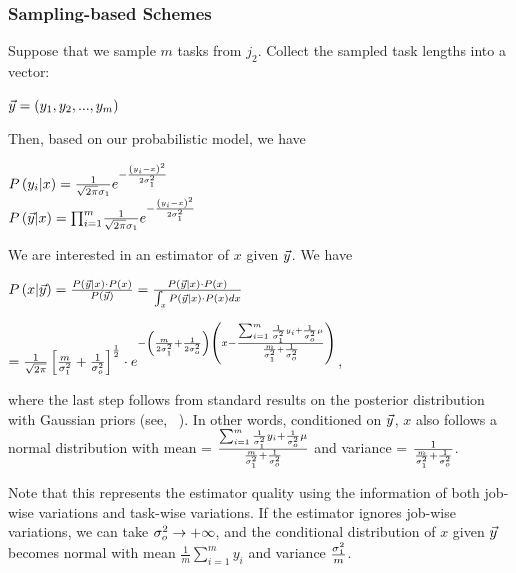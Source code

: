 \subsubsection{Sampling-based Schemes}
\label{sec:accuracy:quantity:sampling}
Suppose that we sample $m$ tasks from $j_2$. Collect the sampled task lengths into a vector:
\begin{center}
	$\vec{y} = \left( y_1, y_2, ..., y_m \right)$
\end{center}
Then, based on our probabilistic model, we have
\begin{center}
	$P\left(y_i|x\right) = \frac{1}{\sqrt{2\pi}\sigma_1}e^{-\frac{\left(y_i - x\right)^2}{2\sigma_1^2}}$\\
	$P\left(\vec{y}|x\right) = {\prod_{i=1}^{m}}\frac{1}{\sqrt{2\pi}\sigma_1}e^{-\frac{\left(y_i - x\right)^2}{2\sigma_1^2}}$
\end{center}
We are interested in an estimator of $x$ given $\vec{y}$. We have 
\begin{center}
	$P\left(x|\vec{y}\right) = \frac{P\left(\vec{y}|x\right)\cdot P(x)}{P(\vec{y})} = \frac{P(\vec{y}|x)\cdot P(x)}{\int_{x}P(\vec{y}|x)\cdot P(x)dx}$

	$= \frac{1}{\sqrt{2\pi}}\left[\frac{m}{\sigma_1^2} +
	\frac{1}{\sigma_o^2}\right]^\frac{1}{2} \cdot e^{-
	\left(\frac{m}{2\sigma_1^2} +
	\frac{1}{2\sigma_o^2}\right)\left(x -
	\frac{{\sum_{i=1}^{m}\frac{1}{\sigma_1^2}y_{i} +
	\frac{1}{\sigma_o^2}\mu}}{\frac{m}{\sigma_1^2} +
	\frac{1}{\sigma_o^2}}\right)}$,
\end{center}
where the last step follows from standard results on the posterior distribution
with Gaussian priors (see, \eg~\cite{jordanLecturePosterirorDistribution}).
In other words, conditioned on $\vec{y}$, $x$ also follows a normal distribution with
mean = $ \frac{{\sum_{i=1}^{m}\frac{1}{\sigma_1^2}y_{i} + \frac{1}{\sigma_o^2}\mu}}{\frac{m}{\sigma_1^2} + \frac{1}{\sigma_o^2}}$ 
and variance = $\frac{1}{\frac{m}{\sigma_1^2} + \frac{1}{\sigma_o^2}}$.

Note that this represents the estimator quality using the information of
both job-wise variations and task-wise variations. If the estimator ignores
job-wise variations, we can take $\sigma_o^2  \rightarrow +\infty$, and
the conditional distribution of $x$ given $\vec{y}$ becomes normal with mean
$\frac{1}{m} \sum_{i=1}^{m} y_{i}$ and variance $\frac{\sigma_1^2}{m}$.

